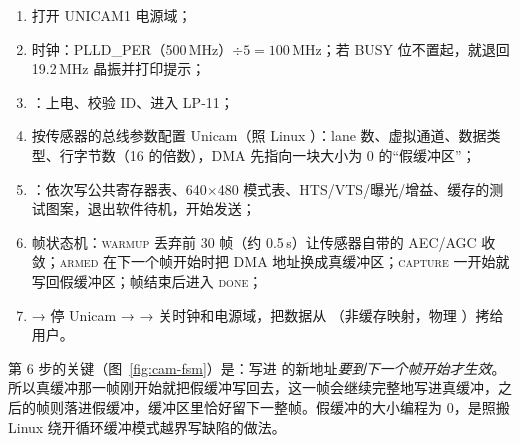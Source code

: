 \begin{enumerate}
  \item {} 打开 UNICAM1 电源域；
  \item {} 时钟：PLLD\_PER（500\,MHz）$\div 5 = 100$\,MHz；若 BUSY 位不置起，就退回 19.2\,MHz 晶振并打印提示；
  \item {}：上电、校验 ID、进入 LP-11；
  \item 按传感器的总线参数配置 Unicam（照 Linux ）：lane 数、虚拟通道、数据类型、行字节数（16 的倍数），DMA 先指向一块大小为 0 的“假缓冲区”；
  \item {}：依次写公共寄存器表、640$\times$480 模式表、HTS/VTS/曝光/增益、缓存的测试图案，退出软件待机，开始发送；
  \item 帧状态机：\textsc{warmup} 丢弃前 30 帧（约 0.5\,s）让传感器自带的 AEC/AGC 收敛；\textsc{armed} 在下一个帧开始时把 DMA 地址换成真缓冲区；\textsc{capture} 一开始就写回假缓冲区；帧结束后进入 \textsc{done}；
  \item {} → 停 Unicam →  → 关时钟和电源域，把数据从 （非缓存映射，物理 ）拷给用户。
\end{enumerate}

第 6 步的关键（图~\ref{fig:cam-fsm}）是：写进  的新地址\emph{要到下一个帧开始才生效}。所以真缓冲那一帧刚开始就把假缓冲写回去，这一帧会继续完整地写进真缓冲，之后的帧则落进假缓冲，缓冲区里恰好留下一整帧。假缓冲的大小编程为 0，是照搬 Linux 绕开循环缓冲模式越界写缺陷的做法。

